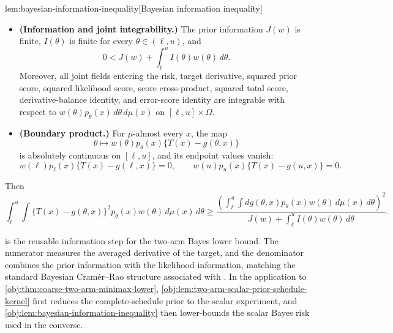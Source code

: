 \begin{lemmav}{lem:bayesian-information-inequality}[Bayesian information inequality]
\begin{itemize}
\item \textbf{(Information and joint integrability.)}  The prior information \(J(w)\) is finite, \(I(\theta)\) is finite for every \(\theta\in(\ell,u)\), and
\[
0<J(w)+\int_\ell^u I(\theta)w(\theta)\,d\theta.
\]
Moreover, all joint fields entering the risk, target derivative, squared prior score, squared likelihood score, score cross-product, squared total score, derivative-balance identity, and error-score identity are integrable with respect to \(w(\theta)p_\theta(x)\,d\theta\,d\mu(x)\) on \([\ell,u]\times\Omega\).
\item \textbf{(Boundary product.)}  For \(\mu\)-almost every \(x\), the map
\[
\theta\mapsto w(\theta)p_\theta(x)\{T(x)-g(\theta,x)\}
\]
is absolutely continuous on \([\ell,u]\), and its endpoint values vanish:
\[
w(\ell)p_\ell(x)\{T(x)-g(\ell,x)\}=0,
\qquad
w(u)p_u(x)\{T(x)-g(u,x)\}=0.
\]
\end{itemize}
Then
\[
\int_\ell^u\int \{T(x)-g(\theta,x)\}^2 p_\theta(x)w(\theta)\,d\mu(x)\,d\theta
\ge
\frac{
\left(\int_\ell^u\int dg(\theta,x)p_\theta(x)w(\theta)\,d\mu(x)\,d\theta\right)^2
}{
J(w)+\int_\ell^u I(\theta)w(\theta)\,d\theta
}.
\]
\end{lemmav}

 is the reusable information step for the two-arm Bayes lower bound. The numerator measures the averaged derivative of the target, and the denominator combines the prior information with the likelihood information, matching the standard Bayesian Cramér--Rao structure associated with \citet{van_trees_1968}. In the application to \cref{obj:thm:coarse-two-arm-minimax-lower}, \cref{obj:lem:two-arm-scalar-prior-schedule-kernel} first reduces the complete-schedule prior to the scalar experiment, and \cref{obj:lem:bayesian-information-inequality} then lower-bounds the scalar Bayes risk used in the converse.
